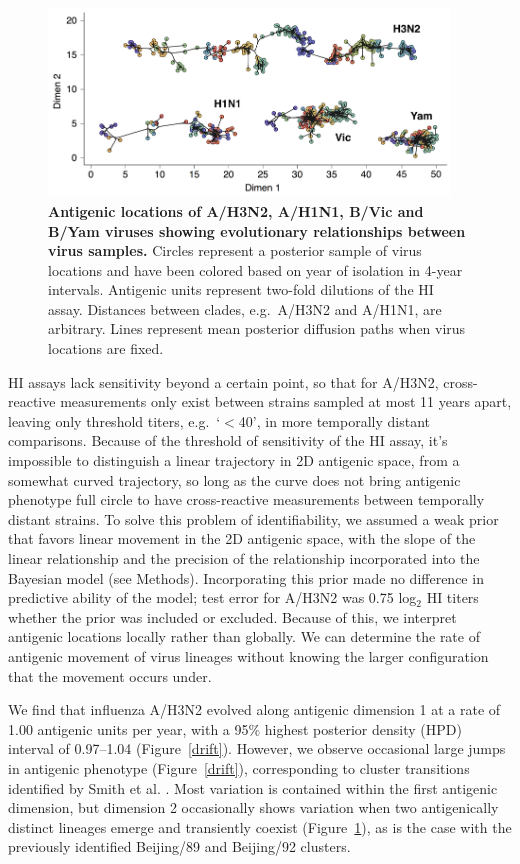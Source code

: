 \documentclass[11pt,oneside,letterpaper]{article}
\begin{document}
\begin{figure}[h]
	\centering		
	\includegraphics[width=0.95\textwidth]{figures/map}
	\caption{\textbf{Antigenic locations of A/H3N2, A/H1N1, B/Vic and B/Yam viruses showing evolutionary relationships between virus samples.} 
	Circles represent a posterior sample of virus locations and have been colored based on year of isolation in 4-year intervals.
	Antigenic units represent two-fold dilutions of the HI assay.
	Distances between clades, e.g.\ A/H3N2 and A/H1N1, are arbitrary.
	Lines represent mean posterior diffusion paths when virus locations are fixed.} 
	\label{map} 
\end{figure}

HI assays lack sensitivity beyond a certain point, so that for A/H3N2, cross-reactive measurements only exist between strains sampled at most 11 years apart, leaving only threshold titers, e.g.\ `$<$40', in more temporally distant comparisons.  
Because of the threshold of sensitivity of the HI assay, it's impossible to distinguish a linear trajectory in 2D antigenic space, from a somewhat curved trajectory, so long as the curve does not bring antigenic phenotype full circle to have cross-reactive measurements between temporally distant strains.
To solve this problem of identifiability, we assumed a weak prior that favors linear movement in the 2D antigenic space, with the slope of the linear relationship and the precision of the relationship incorporated into the Bayesian model (see Methods).
Incorporating this prior made no difference in predictive ability of the model; test error for A/H3N2 was 0.75 log$_2$ HI titers whether the prior was included or excluded.
Because of this, we interpret antigenic locations locally rather than globally.
We can determine the rate of antigenic movement of virus lineages without knowing the larger configuration that the movement occurs under.
 
We find that influenza A/H3N2 evolved along antigenic dimension 1 at a rate of 1.00 antigenic units per year, with a 95\% highest posterior density (HPD) interval of 0.97--1.04 (Figure~\ref{drift}).
However, we observe occasional large jumps in antigenic phenotype (Figure~\ref{drift}), corresponding to cluster transitions identified by Smith et al. \cite{Smith04}.  
Most variation is contained within the first antigenic dimension, but dimension 2 occasionally shows variation when two antigenically distinct lineages emerge and transiently coexist (Figure~\ref{map}), as is the case with the previously identified Beijing/89 and Beijing/92 clusters.
\end{document}
